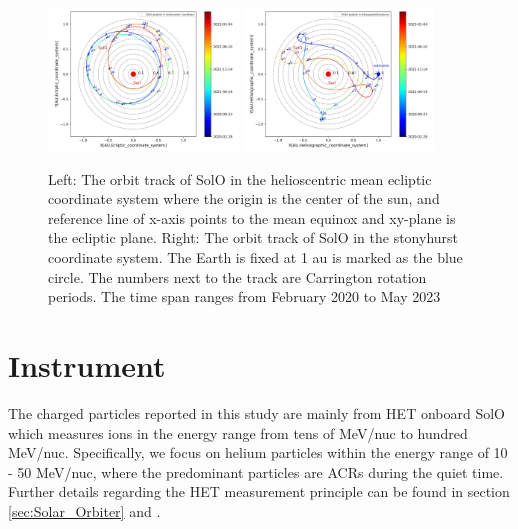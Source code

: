 \begin{figure}
    \centering
    \includegraphics[width=0.45\textwidth]{images/ACR/SOLO_orbit_track_helioscentric_3.png}
    \includegraphics[width = 0.45\textwidth]{images/ACR/SOLO_orbit_stonyhurst_3.png}
    \caption[Orbit track of \ac{Solo}]{Left: The orbit track of \ac{SolO} in the helioscentric mean ecliptic coordinate system where the origin is the center of the sun, and reference line of x-axis points to the mean equinox and xy-plane is the ecliptic plane. Right: The orbit track of \ac{SolO} in the stonyhurst coordinate system. The Earth is fixed at 1 au is marked as the blue circle. 
    The numbers next to the track are Carrington rotation periods. The time span ranges from February 2020 to May 2023}
    \label{fig:SOLO_orbit_track}
\end{figure}




\section{Instrument}


The charged particles reported in this study are mainly from \ac{HET} onboard \ac{SolO} which measures ions in the energy range from tens of MeV/nuc to hundred MeV/nuc. Specifically, we focus on helium particles within the energy range of 10 - 50 MeV/nuc, where the predominant particles are \acp{ACR} during the quiet time. Further details regarding the \ac{HET} measurement principle can be found in section \ref{sec:Solar_Orbiter} and \citet{RodriguezPacheco-2019-EPD}.

